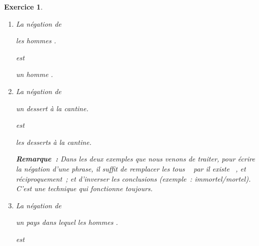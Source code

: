 \documentclass[10pt]{article}
\newtheorem{exo}{Exercice}
\begin{document}
\begin{exo}%


\begin{enumerate}
\item La négation de

\begin{center}

  \black les hommes \black .
 
 \end{center}
 
 est
 
 \begin{center}

  \black un homme \black .
 
 \end{center}
 
\item La négation de

\begin{center}

  \black un dessert  \black à la cantine.
 
 \end{center}
 
 est
 
 \begin{center}

  \black les desserts  \black à la cantine.
 \end{center}
 
 \medskip

\textbf{Remarque~:} Dans les deux exemples que nous venons de traiter, pour écrire la négation d'une phrase, il suffit de remplacer les \og tous \fg~{} par \og il existe \fg~{}, et réciproquement~; et d'inverser les conclusions (exemple~: immortel/mortel). C'est une technique qui fonctionne toujours.
\item La négation de

\begin{center}

  \black un pays dans lequel  \black les hommes \black {}\black .
 
 \end{center}
 
 est
 
 \begin{center}


\end{center}
\end{enumerate}
\end{exo}
\end{document}
